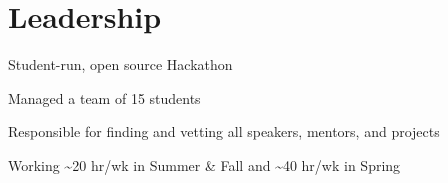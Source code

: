 \documentclass[]{deedy-resume-openfont}
\begin{document}
\begin{minipage}[t]{0.66\textwidth}






\vspace{8pt}

\section{Leadership}
\begin{tightemize}
\item Student-run, open source Hackathon
\item Managed a team of 15 students
\item Responsible for finding and vetting all speakers, mentors, and projects
\item Working \textasciitilde20 hr/wk in Summer \& Fall and \textasciitilde40 hr/wk in Spring
\end{tightemize}
\sectionsep


\end{minipage}
\end{document}
